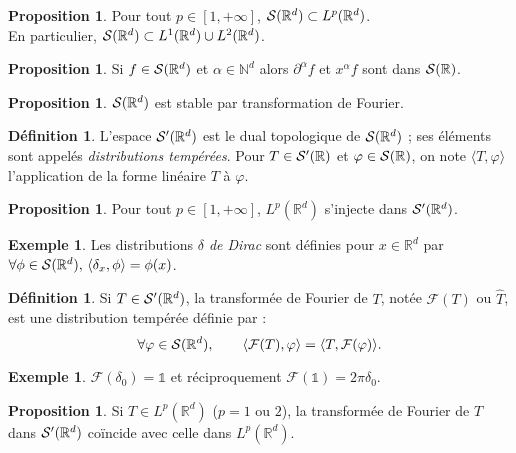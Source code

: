 \documentclass[11pt,a4paper,twocolumn]{article}
\theoremstyle{definition}
\newtheorem{definition}[equation]{Définition}
\newtheorem{example}[equation]{Exemple}
\newtheorem{proposition}[equation]{Proposition}
\newcounter{n}
\def\F{\mathbb{F}}
\def\N{\mathbb{N}}
\def\R{\mathbb{R}}
\def\S{{\cal{S}}}
\def\F{\mathcal{F}}
\begin{document}
\begin{proposition}
  Pour tout $p \in [1, +\infty]$, $\S(\R^d) \subset L^p(\R^d)$. \\
  En particulier, $\S(\R^d) \subset L^1(\R^d) \cup L^2(\R^d)$.
\end{proposition}

\begin{proposition}
  Si $f \in \S(\R^d)$ et $\alpha \in \N^d$ alors $\partial^\alpha f$ et
  $x^\alpha f$ sont dans $\S(\R)$.
\end{proposition}

\begin{proposition}
  $\S(\R^d)$ est stable par transformation de Fourier.
\end{proposition}


\begin{definition}
  L'espace $\S'(\R^d)$ est le dual topologique de $\S(\R^d)$ ; ses éléments sont
  appelés \emph{distributions tempérées}. Pour $T \in \S'(\R)$ et $\varphi \in
  \S(\R)$, on note $\langle T, \varphi \rangle$ l'application de la forme
  linéaire $T$ à $\varphi$.
\end{definition}

\begin{proposition}
  Pour tout $p \in [1, +\infty]$, $L^p(\R^d)$ s'injecte dans $\S'(\R^d)$.
\end{proposition}

\begin{example}
  Les distributions \emph{$\delta$ de Dirac} sont définies pour $x \in \R^d$ par\\
  $\forall \phi \in \S(\R^d),\,\langle \delta_x, \phi \rangle = \phi(x)$.
\end{example}


\begin{definition}
  Si $T \in \S'(\R^d)$, la transformée de Fourier de $T$, notée $\F(T)$ ou
  $\hat{T}$, est une distribution tempérée définie par :
\[ \forall \varphi \in \S(\R^d), \qquad \langle \F(T), \varphi \rangle = \langle T, \F (\varphi) \rangle. \]
\end{definition}

\begin{example}
$\F (\delta_0) = \mathbb{1}$ et réciproquement $\F (\mathbb{1}) = 2\pi\delta_0$.
\end{example}

\begin{proposition}
  Si $T \in L^p(\R^d)$ ($p = 1 \text{ ou } 2$), la transformée de Fourier de $T$
  dans $\S'(\R^d)$ coïncide avec celle dans $L^p(\R^d)$.
\end{proposition}
\end{document}
